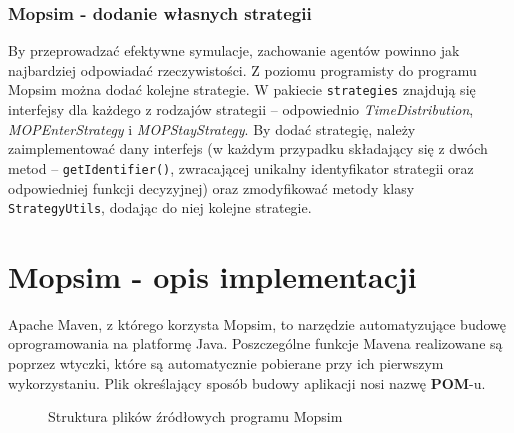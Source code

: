 \subsubsection{Mopsim - dodanie własnych strategii}
By przeprowadzać efektywne symulacje, zachowanie agentów powinno jak najbardziej odpowiadać rzeczywistości. Z poziomu programisty do programu Mopsim można dodać kolejne strategie. W pakiecie \texttt{strategies} znajdują się interfejsy dla każdego z rodzajów strategii -- odpowiednio \textit{TimeDistribution}, \textit{MOPEnterStrategy} i \textit{MOPStayStrategy}. By dodać strategię, należy zaimplementować dany interfejs (w każdym przypadku składający się z dwóch metod -- \texttt{getIdentifier()}, zwracającej unikalny identyfikator strategii oraz odpowiedniej funkcji decyzyjnej) oraz zmodyfikować metody klasy \texttt{StrategyUtils}, dodając do niej kolejne strategie.

\section{Mopsim - opis implementacji}
Apache Maven, z którego korzysta Mopsim, to narzędzie automatyzujące budowę oprogramowania na platformę Java. Poszczególne funkcje Mavena realizowane są poprzez wtyczki, które są automatycznie pobierane przy ich pierwszym wykorzystaniu. Plik określający sposób budowy aplikacji nosi nazwę \textbf{POM}-u.

\begin{figure}[!htb]
\caption{Struktura plików źródłowych programu Mopsim}
\label{mopsim_structure}
\end{figure}
